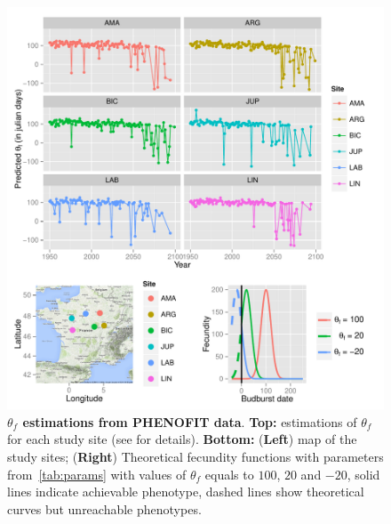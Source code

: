 \begin{figure}[ht!]
	\centering
	\includegraphics[scale=1]{Figures/optsmaps.pdf}
	\caption{\textbf{$\theta_{f}$ estimations from PHENOFIT data}. \textbf{Top:} estimations of $\theta_f$ for each study site (see  for details). \textbf{Bottom:} (\textbf{Left}) map of the study sites; (\textbf{Right}) Theoretical fecundity functions with parameters from~\autoref{tab:params} with values of $\theta_f$ equals to $100$, $20$ and $-20$, solid lines indicate achievable phenotype, dashed lines show theoretical curves but unreachable phenotypes.}
	\label{fig:thetaf}
\end{figure}